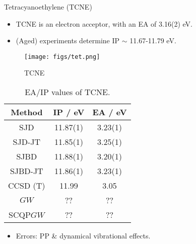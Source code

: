 \documentclass[12pt, pdf, hyperref={draft}, usenames, dvipsnames,
aspectratio=169]{beamer}
\newcommand{\red}[1]{{\bf\color{LancsRed}{#1}}}
\newcommand{\green}[1]{{\bf\color{ForestGreen}{#1}}}
\begin{document}
\begin{frame}{Tetracyanoethylene (TCNE)}
\begin{itemize}

  \item TCNE is an electron acceptor, with an EA of 3.16(2)
  eV.

  \item (Aged) experiments determine IP $\sim$ 11.67-11.79 eV.
\end{itemize}

\vspace{-0.9cm}
\begin{minipage}[t]{0.4\textwidth}

\begin{figure}[H]
  \centering
  \texttt{[image: figs/tet.png]}
  \caption{TCNE}\label{fig:tet}
\end{figure}

\end{minipage}%
\hfill
\begin{minipage}[t]{0.5\textwidth}

\begin{table}[H]
  \centering
  \begin{tabular}{ccc}
  Method  & IP / eV  & EA / eV \\ \hline
  SJD     & 11.87(1) & 3.23(1)  \\
  SJD-JT  & 11.85(1) & 3.25(1)  \\
  SJBD    & 11.88(1) & 3.20(1)  \\
  SJBD-JT & 11.86(1) & 3.23(1)  \\ \hline
  CCSD (T) & 11.99 & 3.05 \\
  $GW$    &?? &?? \\
  SCQP$GW$&?? &??
  \end{tabular}
  \caption{EA/IP values of TCNE.}\label{tab:label}
\end{table}

\end{minipage}%

\begin{itemize}
  \item Errors: PP \& dynamical vibrational effects.
\end{itemize}

\end{frame}
\end{document}
